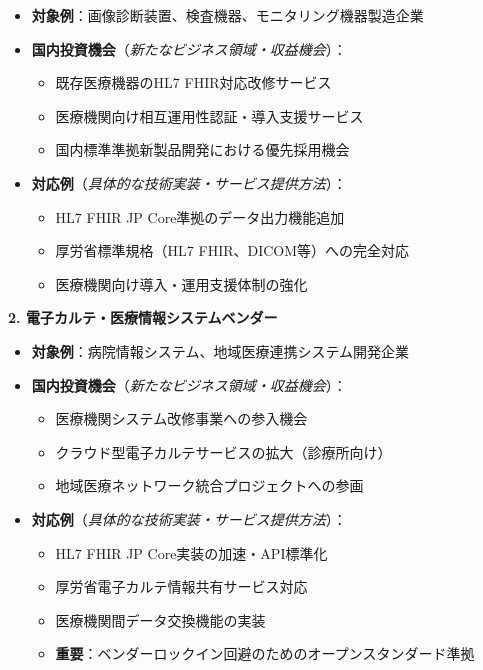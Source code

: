 \documentclass[
  a4paper,
  a4paper,
  11pt]{ltjsbook}
\providecommand{\tightlist}{%
  \setlength{\itemsep}{0pt}\setlength{\parskip}{0pt}}
\begin{document}
\begin{itemize}
\item
  \textbf{対象例}：画像診断装置、検査機器、モニタリング機器製造企業
\item
  \textbf{国内投資機会}（\emph{新たなビジネス領域・収益機会}）：

  \begin{itemize}
  \tightlist
  \item
    既存医療機器のHL7 FHIR対応改修サービス
  \item
    医療機関向け相互運用性認証・導入支援サービス
  \item
    国内標準準拠新製品開発における優先採用機会
  \end{itemize}
\item
  \textbf{対応例}（\emph{具体的な技術実装・サービス提供方法}）：

  \begin{itemize}
  \tightlist
  \item
    HL7 FHIR JP Core準拠のデータ出力機能追加
  \item
    厚労省標準規格（HL7 FHIR、DICOM等）への完全対応
  \item
    医療機関向け導入・運用支援体制の強化
  \end{itemize}
\end{itemize}

\textbf{2. 電子カルテ・医療情報システムベンダー}

\begin{itemize}
\item
  \textbf{対象例}：病院情報システム、地域医療連携システム開発企業
\item
  \textbf{国内投資機会}（\emph{新たなビジネス領域・収益機会}）：

  \begin{itemize}
  \tightlist
  \item
    医療機関システム改修事業への参入機会
  \item
    クラウド型電子カルテサービスの拡大（診療所向け）
  \item
    地域医療ネットワーク統合プロジェクトへの参画
  \end{itemize}
\item
  \textbf{対応例}（\emph{具体的な技術実装・サービス提供方法}）：

  \begin{itemize}
  \tightlist
  \item
    HL7 FHIR JP Core実装の加速・API標準化
  \item
    厚労省電子カルテ情報共有サービス対応
  \item
    医療機関間データ交換機能の実装
  \item
    \textbf{重要}：ベンダーロックイン回避のためのオープンスタンダード準拠
  \end{itemize}
\end{itemize}
\end{document}
